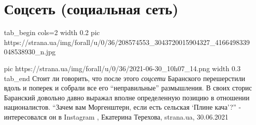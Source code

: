  
 
 
 
 
\chapter{Соцсеть (социальная сеть)}

\ifcmt
tab_begin cols=2
  width 0.2
  pic https://strana.ua/img/forall/u/0/36/208574553_3043720015904327_4166498339048538930_n.jpg

  pic https://strana.ua/img/forall/u/0/36/2021-06-30_10h07_14.png
  width 0.3
tab_end
\fi
Стоит ли говорить, что после этого \emph{соцсети} Баранского перешерстили вдоль и
поперек и собрали все его \enquote{неправильные} размышления.  В своих сторис
Баранский довольно давно выражал вполне определенную позицию в отношении
националистов.  \enquote{Зачем вам Моргенштерн, если есть сельская
\enquote{Плине кача}?} - интересовался он в Instagram
, 
Екатерина Терехова, strana.ua, 30.06.2021
